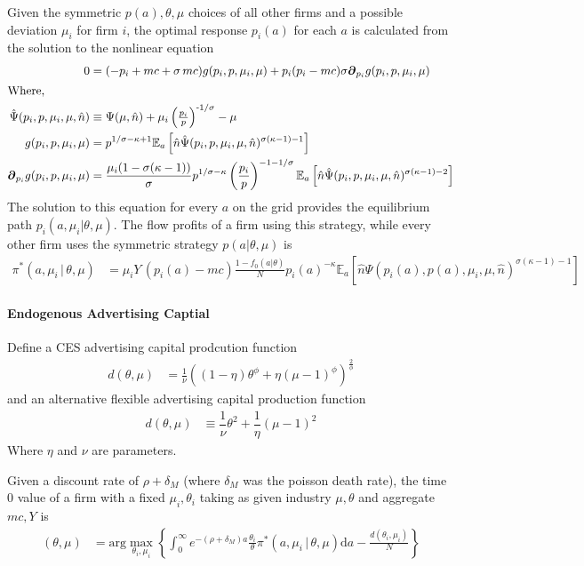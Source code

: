 \documentclass[12pt]{article}
\newcommand{\D}[1][]{\ensuremath{\boldsymbol{\partial}_{#1}}}
\newcommand{\expec}[2][]{\ensuremath{\mathbb{E}_{{#1}}\left[ {#2} \right]}}
\newcommand{\diff}{\ensuremath{\mathrm{d}}}
\newcommand{\argmax}[2]{\ensuremath{\mathrm{arg} \max_{{#1}}\left\{ {#2} \right\}}}
\begin{document}
Given the symmetric $p(a), \theta, \mu$ choices of all other firms and a possible deviation $\mu_i$ for firm $i$, the optimal response $p_i(a)$ for each $a$ is calculated from the solution to the nonlinear equation
\begin{align}
	0 &= (-p_i + mc + \sigma\,mc)g(p_i,p, \mu_i, \mu)+ p_i(p_i-mc)\sigma \D[p_i]g(p_i,p, \mu_i, \mu)\label{eq:off-equilibrium-price}		\\
	\intertext{Where,}
	\hat{\Psi}(p_i, p, \mu_i, \mu, \hat{n}) &\equiv \Psi(\mu, \hat{n}) + \mu_i \left(\tfrac{p_i}{p}\right)^{\text{-}1/\sigma} - \mu\label{eq:Psi-hat-def}\\	
	g(p_i,p, \mu_i, \mu) &= p^{1/\sigma - \kappa + 1}\expec[a]{\hat{n}\hat{\Psi}(p_i, p, \mu_i, \mu, \hat{n})^{\sigma(\kappa-1)-1}}\label{eq:g-off}\\
	\D[p_i]g(p_i,p, \mu_i, \mu) &= \frac{\mu_i (1-\sigma(\kappa - 1))}{\sigma}p^{1/\sigma-\kappa}\left(\frac{p_i}{p}\right)^{-1 - 1/\sigma}\expec[a]{ \hat{n}\hat{\Psi}(p_i, p, \mu_i, \mu, \hat{n})^{\sigma(\kappa - 1)-2} }\label{eq:D-g-off}
\end{align}
The solution to this equation for every $a$ on the grid provides the equilibrium path $p_i(a, \mu_i | \theta, \mu)$.  The flow profits of a firm using this strategy, while every other firm uses the symmetric strategy $p(a | \theta, \mu)$ is
\begin{align}
	\pi^{*}(a, \mu_i\,|\, \theta, \mu) &= \mu_i Y \, (p_i(a) - mc)\frac{1 - f_0(a|\theta)}{N}p_i(a) ^{-\kappa}\expec[a]{ \hat{n}\hat{\Psi}(p_i(a), p(a), \mu_i, \mu, \hat{n})^{\sigma(\kappa - 1)-1} }
\end{align}


\paragraph{Endogenous Advertising Captial}
Define a CES advertising capital prodcution function
\begin{align}
d(\theta, \mu) &= \frac{1}{\nu}\left((1-\eta)\theta^{\phi} + \eta(\mu - 1)^{\phi}\right)^{\frac{2}{\phi}}
\end{align}
and an alternative flexible advertising capital production function
\begin{align}
	d(\theta, \mu) &\equiv 
	\dfrac{1}{\nu}\theta^2 + \dfrac{1}{\eta} (\mu-1)^2
\end{align}
Where $\eta$ and $\nu$ are parameters.

Given a discount rate of $\rho + \delta_M$ (where $\delta_M$ was the poisson death rate), the time $0$ value of a firm with a fixed $\mu_i, \theta_i$ taking as given industry $\mu, \theta$ and aggregate $mc, Y$ is
\begin{align}
(\theta,\mu) &= \argmax{\theta_i, \mu_i}{\int_0^{\infty}e^{-(\rho + \delta_M)a}\frac{\theta_i}{\theta}\pi^{*}(a, \mu_i\,|\, \theta, \mu) \diff a - \frac{d(\theta_i,\mu_i)}{N}}\label{eq:k-M-theta-stationary-controlled}
\end{align}
\end{document}
